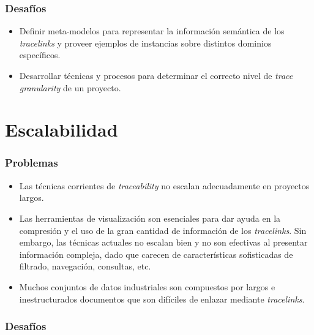 \documentclass[a4paper,12pt,oneside,spanish]{book}
\begin{document}
\subsubsection{Desafíos}

\begin{itemize}[label={\checkmark}]

\item Definir meta-modelos para representar la información semántica de los \textit{tracelinks} y proveer ejemplos de instancias sobre distintos dominios específicos.

\item Desarrollar técnicas y procesos para determinar el correcto nivel de \textit{trace granularity} de un proyecto.

\end{itemize}

\section{Escalabilidad}

\subsubsection{Problemas}

\begin{itemize}[label={$\times$}]

\item Las técnicas corrientes de \textit{traceability} no escalan adecuadamente en proyectos largos.

\item Las herramientas de visualización son esenciales para dar ayuda en la compresión y el uso de la gran cantidad de información de los \textit{tracelinks}. Sin embargo, las técnicas actuales no escalan bien y no son efectivas al presentar información compleja, dado que carecen de características sofisticadas de filtrado, navegación, consultas, etc.

\item Muchos conjuntos de datos industriales son compuestos por largos e inestructurados documentos que son difíciles de enlazar mediante \textit{tracelinks}.
\end{itemize}

\subsubsection{Desafíos}
\end{document}
